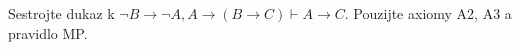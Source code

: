 Sestrojte dukaz k $\neg B \to \neg A, A \to (B \to C) \vdash A \to C$.
Pouzijte axiomy A2, A3 a pravidlo MP.
